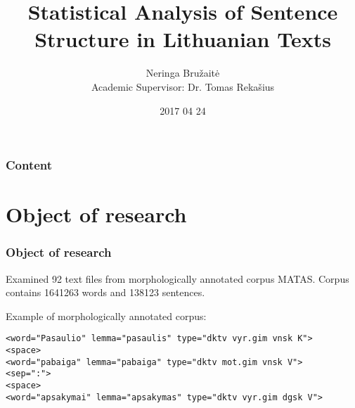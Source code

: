 \documentclass{beamer}
\institute[]{
Vilnius Gediminas Technical University
}
\title[]
{\centering  
Statistical Analysis of Sentence Structure in Lithuanian Texts
}
\author[Neringa Bružaitė, Tomas Rekašius]
{ 
 Neringa Bružaitė \bigskip \\  \small 
 Academic Supervisor: Dr. Tomas Rekašius \vspace{5mm}
}
\date{ \tiny 2017 04 24}
\begin{document}
\begin{frame}
\titlepage %
\end{frame}

\begin{frame}
\frametitle{Content} 
\tableofcontents 
\end{frame}


\section{Object of research} 



\begin{frame}[fragile]
\frametitle{Object of research}
%
Examined \alert{92} text files from morphologically annotated corpus MATAS.
\smallskip
Corpus contains \alert{1641263} words and \alert{138123} sentences.
%
\bigskip

Example of morphologically annotated corpus:
%
\begin{Verbatim}[frame=single, fontsize=\small]
<word="Pasaulio" lemma="pasaulis" type="dktv vyr.gim vnsk K">
<space>
<word="pabaiga" lemma="pabaiga" type="dktv mot.gim vnsk V">
<sep=":">
<space>
<word="apsakymai" lemma="apsakymas" type="dktv vyr.gim dgsk V">
\end{Verbatim}
%
\end{frame}

\end{document}
